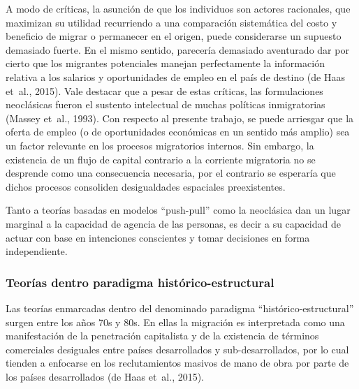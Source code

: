 \documentclass[12pt,spanish,]{article}
\begin{document}
A modo de críticas, la asunción de que los individuos son actores
racionales, que maximizan su utilidad recurriendo a una comparación
sistemática del costo y beneficio de migrar o permanecer en el origen,
puede considerarse un supuesto demasiado fuerte. En el mismo sentido,
parecería demasiado aventurado dar por cierto que los migrantes
potenciales manejan perfectamente la información relativa a los salarios
y oportunidades de empleo en el país de destino (de Haas et~al., 2015).
Vale destacar que a pesar de estas críticas, las formulaciones
neoclásicas fueron el sustento intelectual de muchas políticas
inmigratorias (Massey et~al., 1993). Con respecto al presente trabajo,
se puede arriesgar que la oferta de empleo (o de oportunidades
económicas en un sentido más amplio) sea un factor relevante en los
procesos migratorios internos. Sin embargo, la existencia de un flujo de
capital contrario a la corriente migratoria no se desprende como una
consecuencia necesaria, por el contrario se esperaría que dichos
procesos consoliden desigualdades espaciales preexistentes.

Tanto a teorías basadas en modelos ``push-pull'' como la neoclásica dan
un lugar marginal a la capacidad de agencia de las personas, es decir a
su capacidad de actuar con base en intenciones conscientes y tomar
decisiones en forma independiente.

\hypertarget{teoruxedas-dentro-paradigma-histuxf3rico-estructural}{%
\subsubsection{Teorías dentro paradigma
histórico-estructural}\label{teoruxedas-dentro-paradigma-histuxf3rico-estructural}}

Las teorías enmarcadas dentro del denominado paradigma
``histórico-estructural'' surgen entre los años 70s y 80s. En ellas la
migración es interpretada como una manifestación de la penetración
capitalista y de la existencia de términos comerciales desiguales entre
países desarrollados y sub-desarrollados, por lo cual tienden a
enfocarse en los reclutamientos masivos de mano de obra por parte de los
países desarrollados (de Haas et~al., 2015).
\end{document}
